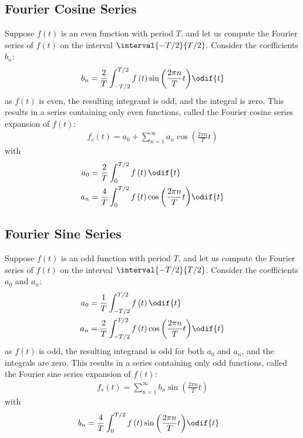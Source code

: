 \documentclass{article}
\begin{document}
\subsection{Fourier Cosine Series}
Suppose \(f\left( t \right)\) is an even function with period \(T\),
and let us compute the Fourier series of \(f\left( t \right)\) on the
interval \(\interval{-T/2}{T/2}\). Consider the coefficients \(b_n\):
\begin{equation*}
    b_n = \frac{2}{T} \int_{-T/2}^{T/2} f\left( t \right) \sin{\left( \frac{2\pi n}{T} t \right)} \odif{t}
\end{equation*}
as \(f\left( t \right)\) is even, the resulting integrand is odd, and
the integral is zero. This results in a series containing only even
functions, called the Fourier cosine series expansion of
\(f\left( t \right)\):
\begin{align*}
    f_c\left( t \right) = a_0 + \sum_{n=1}^{\infty} a_n \cos{\left( \frac{2\pi n}{T} t \right)}
\end{align*}
with
\begin{align*}
    a_0 & = \frac{2}{T} \int_{0}^{T/2} f\left( t \right) \odif{t}                                         \\
    a_n & = \frac{4}{T} \int_{0}^{T/2} f\left( t \right) \cos{\left( \frac{2\pi n}{T} t \right)} \odif{t}
\end{align*}
\subsection{Fourier Sine Series}
Suppose \(f\left( t \right)\) is an odd function with period \(T\), and
let us compute the Fourier series of \(f\left( t \right)\) on the
interval \(\interval{-T/2}{T/2}\). Consider the coefficients \(a_0\)
and \(a_n\):
\begin{align*}
    a_0 & = \frac{1}{T} \int_{-T/2}^{T/2} f\left( t \right) \odif{t}                                         \\
    a_n & = \frac{2}{T} \int_{-T/2}^{T/2} f\left( t \right) \cos{\left( \frac{2\pi n}{T} t \right)} \odif{t}
\end{align*}
as \(f\left( t \right)\) is odd, the resulting integrand is odd for
both \(a_0\) and \(a_n\), and the integrals are zero. This results in a
series containing only odd functions, called the Fourier sine series
expansion of \(f\left( t \right)\):
\begin{align*}
    f_s\left( t \right) = \sum_{n=1}^{\infty} b_n \sin{\left( \frac{2\pi n}{T} t \right)}
\end{align*}
with
\begin{align*}
    b_n & = \frac{4}{T} \int_{0}^{T/2} f\left( t \right) \sin{\left( \frac{2\pi n}{T} t \right)} \odif{t}
\end{align*}
\end{document}
